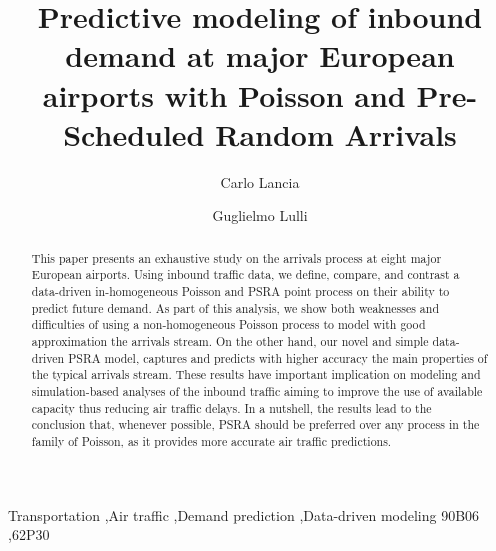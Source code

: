 \documentclass[draft,review]{elsarticle}
\begin{document}
\begin{frontmatter}

\title{Predictive modeling of inbound demand at major European airports with Poisson and Pre-Scheduled Random Arrivals}

\author[address_cl]{Carlo Lancia}

\author[address_gl]{Guglielmo Lulli}

\address[address_cl]{Leiden University Mathematical Institute, Niels Bohrweg 1, 2333 CA, Leiden, NL}
\address[address_gl]{Lancaster University Management School, Bailrigg, Lancaster, LA1 4YX, UK}

\begin{abstract}
  This paper presents an exhaustive study on the arrivals process at eight major European airports. Using inbound traffic data, we define, compare, and contrast a data-driven in-homogeneous Poisson and \ac{PSRA} point process on their ability to predict future demand.
As part of this analysis, we show both weaknesses and difficulties of using a non-homogeneous Poisson process to model with good approximation the arrivals stream. On the other hand, our novel and simple data-driven \ac{PSRA} model, captures and predicts with higher accuracy the main properties of the typical arrivals stream.
These results have important implication on modeling and simulation-based analyses of the inbound traffic aiming to improve the use of available capacity thus reducing air traffic delays. In a nutshell, the results lead to the conclusion that, whenever possible, \ac{PSRA} should be preferred over any process in the family of Poisson, as it provides more accurate air traffic predictions.
\end{abstract}


\begin{keyword}
Transportation \sep Air traffic \sep Demand prediction \sep Data-driven modeling
\MSC[2010] 90B06 \sep  62P30
\end{keyword}

\end{frontmatter}
\end{document}
